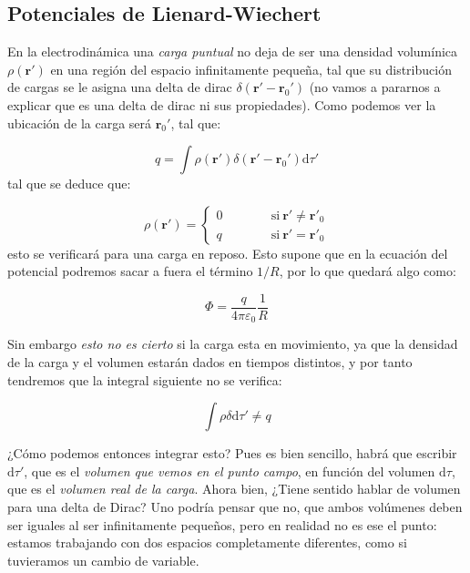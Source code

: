 \documentclass[12pt,a4paper]{article}
\newcommand{\D}{\mathrm{d}}
\newcommand{\tquad}{\quad \quad \quad}
\newcommand{\rn}{\mathbf{r}}
\numberwithin{equation}{section}
\numberwithin{figure}{section}
\begin{document}
\subsection{Potenciales de Lienard-Wiechert}

En la electrodinámica una \textit{carga puntual} no deja de ser una densidad volumínica $\rho(\rn')$  en una región del espacio infinitamente pequeña, tal que  su distribución de cargas se le asigna una delta de dirac $\delta (\rn'-\rn_0')$ (no vamos a pararnos a explicar que es una delta de dirac ni sus propiedades). Como podemos ver la ubicación de la carga será $\rn_0'$, tal que:

\begin{equation}
q = \int \rho (\rn') \delta(\rn'-\rn_0') \D \tau' 
\end{equation}
tal que se deduce que:

\begin{equation}
\rho (\rn') = \left\lbrace \begin{array}{ll}
0 \tquad & \mathrm{si} \ \rn' \neq \rn'_0 \\
q \tquad & \mathrm{si} \ \rn' = \rn'_0
\end{array} \right.
\end{equation}
esto se verificará para una carga en reposo. Esto supone que en la ecuación del potencial podremos sacar a fuera el término $1/R$, por lo que quedará algo como:

$$ \Phi = \dfrac{q}{4 \pi \varepsilon_0} \dfrac{1}{R} $$

Sin embargo \textit{esto no es cierto} si la carga esta en movimiento, ya que la densidad de la carga y el volumen estarán dados en tiempos distintos, y por tanto tendremos que la integral siguiente no se verifica:
 
$$ \int \rho \delta \D \tau ' \neq q $$

¿Cómo podemos entonces integrar esto? Pues es bien sencillo, habrá que escribir $\D \tau'$, que es el \textit{volumen que vemos en el punto campo}, en función del volumen $\D \tau$, que es el \textit{volumen real de la carga}. Ahora bien, ¿Tiene sentido hablar de volumen para una delta de Dirac? Uno podría pensar que no, que ambos volúmenes deben ser iguales al ser infinitamente pequeños, pero en realidad no es ese el punto: estamos trabajando con dos espacios completamente diferentes, como si tuvieramos un cambio de variable. \\
\end{document}
